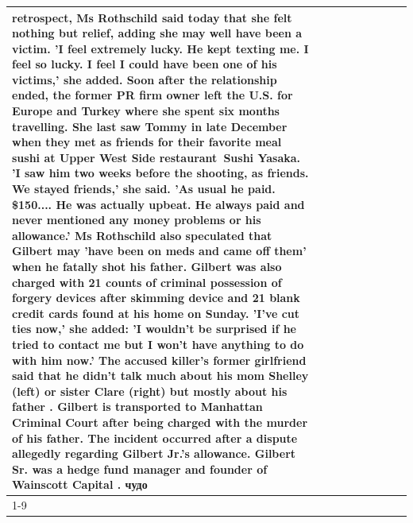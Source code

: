 \begin{table}[H]
\begin{tabular}{lllrlllll}
retrospect, Ms Rothschild said today that she felt nothing but relief, adding she may well have been a victim. 'I feel extremely lucky. He kept texting me. I feel so lucky. I feel I could have been one of his victims,' she added. Soon after the relationship ended, the former PR firm owner left the U.S. for Europe and Turkey where she spent six months  travelling. She last saw Tommy in late December when they met as friends for their favorite meal sushi at Upper West Side restaurant Sushi Yasaka. 'I saw him two weeks before the shooting, as friends. We stayed friends,' she said. 'As usual he paid. \$150.... He was actually upbeat. He always paid and never mentioned any money problems or his allowance.' Ms Rothschild also speculated that Gilbert may 'have been on meds and came off them' when he fatally shot his father. Gilbert was also charged with 21 counts of criminal possession of forgery devices after skimming device and 21 blank credit cards found at his home on Sunday. 'I've cut ties now,' she added: 'I wouldn’t be surprised if he tried to contact me but I won’t have anything to do with him now.' The accused killer's former girlfriend said that he didn't talk much about his mom Shelley (left) or sister Clare (right) but mostly about his father . Gilbert is transported to Manhattan Criminal Court  after being charged with the murder of his father. The incident occurred after a dispute allegedly regarding Gilbert Jr.'s allowance. Gilbert Sr. was a hedge fund manager and founder of Wainscott Capital . чудо \\
\cline{1-9}

\end{tabular}
\end{table}
